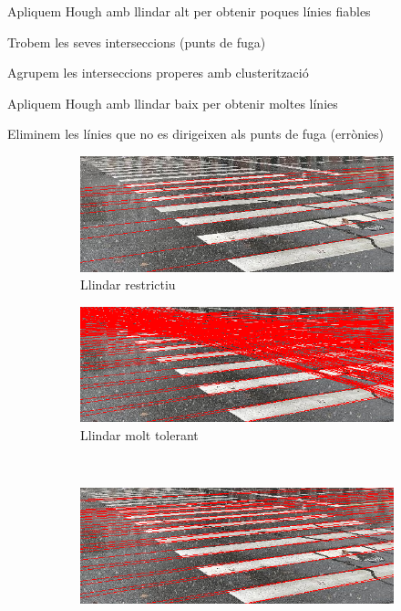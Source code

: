 \documentclass[10pt,a4paper,twocolumn,twoside]{article}
\begin{document}
\vspace*{-0.15em}
\begin{enumerate}[]
	{\small
	\item Apliquem Hough amb llindar alt per obtenir poques línies fiables
	\item Trobem les seves interseccions (punts de fuga)
	\item Agrupem les interseccions properes amb clusterització
	\item Apliquem Hough amb llindar baix per obtenir moltes línies
	\item Eliminem les línies que no es dirigeixen als punts de fuga (errònies)
}
\end{enumerate}

\begin{figure}[!h]
	\centering
	\begin{subfigure}{0.45\columnwidth}
		\includegraphics[width=\linewidth]{figs/Hough_restrictiu}
		\caption{Llindar restrictiu}
	\end{subfigure}
	\quad 
	\begin{subfigure}{0.45\columnwidth}
		\includegraphics[width=\linewidth]{figs/Hough_molt_tolerant}
		\caption{Llindar molt tolerant}
	\end{subfigure}
	\ 
	\begin{subfigure}{0.45\columnwidth}
		\includegraphics[width=\linewidth]{figs/filtrat_fuga}

\end{subfigure}
\end{figure}
\end{document}
